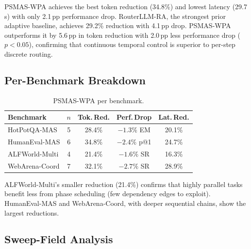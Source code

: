 \documentclass[10pt,twocolumn]{article}
\theoremstyle{plain}
\theoremstyle{definition}
\theoremstyle{remark}
\begin{document}
PSMAS-WPA achieves the best token reduction (34.8\%) and lowest
latency (29.7\,s) with only 2.1\,pp performance drop.
RouterLLM-RA, the strongest prior adaptive baseline, achieves 29.2\%
reduction with 4.1\,pp drop.  PSMAS-WPA outperforms it by 5.6\,pp
in token reduction with 2.0\,pp less performance drop ($p<0.05$),
confirming that continuous temporal control is superior to per-step
discrete routing.

\subsection{Per-Benchmark Breakdown}

\begin{table}[h]
\centering\scriptsize
\caption{PSMAS-WPA per benchmark.}
\label{tab:perbench}
\setlength{\tabcolsep}{3pt}
\begin{tabular}{@{}lcccc@{}}
\toprule
\textbf{Benchmark} & $n$ & \textbf{Tok.\,Red.} & \textbf{Perf.\,Drop} & \textbf{Lat.\,Red.}\\
\midrule
HotPotQA-MAS   &5& 28.4\% & $-1.3\%$ EM  & 20.1\%\\
HumanEval-MAS  &6& 34.8\% & $-2.4\%$ p@1 & 24.7\%\\
ALFWorld-Multi &4& 21.4\% & $-1.6\%$ SR  & 16.3\%\\
WebArena-Coord &7& 32.1\% & $-2.7\%$ SR  & 28.9\%\\
\bottomrule
\end{tabular}
\end{table}

ALFWorld-Multi's smaller reduction (21.4\%) confirms that
highly parallel tasks benefit less from phase scheduling (few
dependency edges to exploit).  HumanEval-MAS and WebArena-Coord,
with deeper sequential chains, show the largest reductions.

\subsection{Sweep-Field Analysis}
\end{document}
